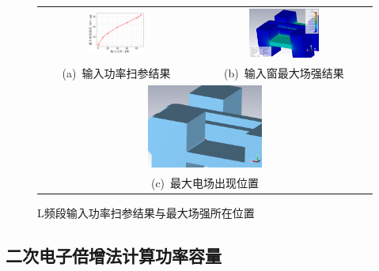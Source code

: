 \documentclass[master]{thesis-uestc}
\begin{document}
\begin{figure}[!htb]
    \small
    \centering
    \begin{tabular}{@{\ }c@{\ }c}
        \includegraphics[width=0.39\textwidth]{pic/chapter4/L输入功率VS最大场强.png} & 
        \hspace{5pt}
        \includegraphics[width=0.42\textwidth]{pic/chapter4/L频段最大场强到达阈值.png}     \\
        \mbox{\small (a) 输入功率扫参结果}                                                                               & 
        \mbox{\small (b) 输入窗最大场强结果}                                                           \\[6bp]
        \multicolumn{2}{c}{\includegraphics[width=0.35\textwidth]{pic/chapter4/L频段最大场强所在位置.png}} \\  %
        \multicolumn{2}{c}{\mbox{\small (c) 最大电场出现位置}}             
    \end{tabular}
    \caption{L频段输入功率扫参结果与最大场强所在位置}
    \label{fig:L输入窗最大场强结果}
\end{figure}

\subsection{二次电子倍增法计算功率容量}
\end{document}
